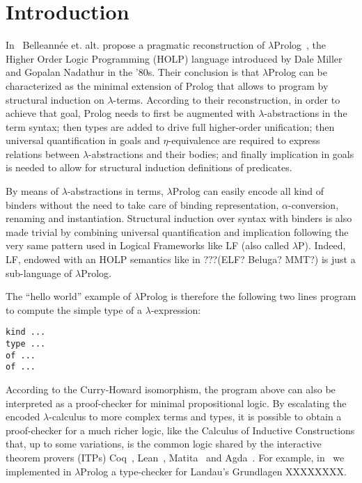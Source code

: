 \documentclass{easychair}
\begin{document}
\section{Introduction}

In~\cite{jlp98} Belleannée et. alt. propose a pragmatic reconstruction of $\lambda$Prolog~\cite{lambdap1,lambdap2,lambdap3}, the Higher Order Logic Programming (HOLP) language introduced by Dale Miller and Gopalan Nadathur in the '80s.
Their conclusion is that $\lambda$Prolog can be characterized as the minimal extension of Prolog that allows to program by structural induction on $\lambda$-terms. According to their reconstruction, in order to achieve that goal, Prolog needs to first be augmented with $\lambda$-abstractions in the term syntax; then types are added to drive full higher-order unification; then universal quantification in goals and $\eta$-equivalence are required to express relations between $\lambda$-abstractions and their bodies; and finally implication in goals is needed to allow for structural induction definitions of predicates.

By means of $\lambda$-abstractions in terms, $\lambda$Prolog can easily encode all kind of binders without the need to take care of binding representation, $\alpha$-conversion, renaming and instantiation. Structural induction over syntax with binders is also made trivial by combining universal quantification and implication following the very same pattern used in Logical Frameworks like LF (also called $\lambda$P). Indeed, LF, endowed with an HOLP semantics like in ???(ELF? Beluga? MMT?) is just a sub-language of $\lambda$Prolog.

The ``hello world'' example of $\lambda$Prolog is therefore the following two lines program to compute the simple type of a $\lambda$-expression:

\begin{verbatim}
kind ...
type ...
of ...
of ...
\end{verbatim}

According to the Curry-Howard isomorphism, the program above can also be interpreted as a proof-checker for minimal propositional logic. By escalating the encoded $\lambda$-calculus to more complex terms and types, it is possible to obtain a proof-checker for a much richer logic, like the Calculus of Inductive Constructions that, up to some variations, is the common logic shared by the interactive theorem provers (ITPs) Coq~\cite{}, Lean~\cite{}, Matita~\cite{} and Agda~\cite{}. For example, in~\cite{us} we implemented in $\lambda$Prolog a type-checker for Landau's Grundlagen XXXXXXXX.
\end{document}
